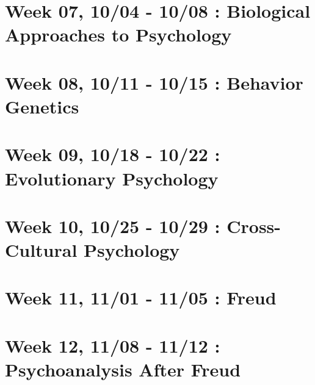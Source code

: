 \documentclass[
]{book}
\begin{document}
\hypertarget{week-07-1004---1008-biological-approaches-to-psychology}{%
\section*{Week 07, 10/04 - 10/08 : Biological Approaches to Psychology}\label{week-07-1004---1008-biological-approaches-to-psychology}}

\hypertarget{week-08-1011---1015-behavior-genetics}{%
\section*{Week 08, 10/11 - 10/15 : Behavior Genetics}\label{week-08-1011---1015-behavior-genetics}}

\hypertarget{week-09-1018---1022-evolutionary-psychology}{%
\section*{Week 09, 10/18 - 10/22 : Evolutionary Psychology}\label{week-09-1018---1022-evolutionary-psychology}}

\hypertarget{week-10-1025---1029-cross-cultural-psychology}{%
\section*{Week 10, 10/25 - 10/29 : Cross-Cultural Psychology}\label{week-10-1025---1029-cross-cultural-psychology}}

\hypertarget{week-11-1101---1105-freud}{%
\section*{Week 11, 11/01 - 11/05 : Freud}\label{week-11-1101---1105-freud}}

\hypertarget{week-12-1108---1112-psychoanalysis-after-freud}{%
\section*{Week 12, 11/08 - 11/12 : Psychoanalysis After Freud}\label{week-12-1108---1112-psychoanalysis-after-freud}}
\end{document}
